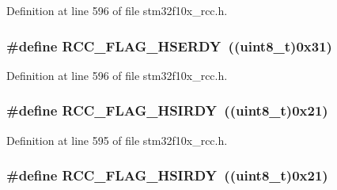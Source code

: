 Definition at line 596 of file stm32f10x\+\_\+rcc.\+h.

\subsubsection[{\texorpdfstring{R\+C\+C\+\_\+\+F\+L\+A\+G\+\_\+\+H\+S\+E\+R\+DY}{RCC_FLAG_HSERDY}}]{\setlength{\rightskip}{0pt plus 5cm}\#define R\+C\+C\+\_\+\+F\+L\+A\+G\+\_\+\+H\+S\+E\+R\+DY~(({\bf uint8\+\_\+t})0x31)}\hypertarget{group___r_c_c___flag_ga173edf47bec93cf269a0e8d0fec9997c}{}\label{group___r_c_c___flag_ga173edf47bec93cf269a0e8d0fec9997c}


Definition at line 596 of file stm32f10x\+\_\+rcc.\+h.

\subsubsection[{\texorpdfstring{R\+C\+C\+\_\+\+F\+L\+A\+G\+\_\+\+H\+S\+I\+R\+DY}{RCC_FLAG_HSIRDY}}]{\setlength{\rightskip}{0pt plus 5cm}\#define R\+C\+C\+\_\+\+F\+L\+A\+G\+\_\+\+H\+S\+I\+R\+DY~(({\bf uint8\+\_\+t})0x21)}\hypertarget{group___r_c_c___flag_ga827d986723e7ce652fa733bb8184d216}{}\label{group___r_c_c___flag_ga827d986723e7ce652fa733bb8184d216}


Definition at line 595 of file stm32f10x\+\_\+rcc.\+h.

\subsubsection[{\texorpdfstring{R\+C\+C\+\_\+\+F\+L\+A\+G\+\_\+\+H\+S\+I\+R\+DY}{RCC_FLAG_HSIRDY}}]{\setlength{\rightskip}{0pt plus 5cm}\#define R\+C\+C\+\_\+\+F\+L\+A\+G\+\_\+\+H\+S\+I\+R\+DY~(({\bf uint8\+\_\+t})0x21)}\hypertarget{group___r_c_c___flag_ga827d986723e7ce652fa733bb8184d216}{}\label{group___r_c_c___flag_ga827d986723e7ce652fa733bb8184d216}


